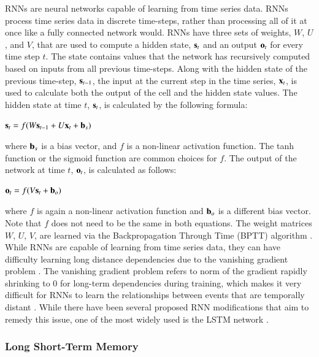\ac{RNNs} are neural networks capable of learning from time series data. \ac{RNNs} process time series data in discrete time-steps, rather than processing all of it at once like a fully connected network would. \ac{RNNs} have three sets of weights, $W$, $U$, and $V$, that are used to compute a hidden state, $\text{{\bf s}}_{t}$ and an output $\text{{\bf o}}_t$ for every time step $t$. The state contains values that the network has recursively computed based on inputs from all previous time-steps. Along with the hidden state of the previous time-step, $\text{{\bf s}}_{t-1}$, the input at the current step in the time series, $\text{{\bf x}}_t$, is used to calculate both the output of the cell and the hidden state values. The hidden state at time $t$, $\text{{\bf s}}_t$, is calculated by the following formula:

\begin{center}
   $\text{{\bf s}}_t = f(W\text{{\bf s}}_{t-1} + U\text{{\bf x}}_{t} + \text{{\bf b}}_s)$
\end{center}
where $\text{{\bf b}}_s$ is a bias vector, and $f$ is a non-linear activation function. The tanh function or the sigmoid function are common choices for $f$. The output of the network at time $t$, $\text{{\bf o}}_t$, is calculated as follows:

\begin{center}
    $\text{{\bf o}}_t = f(V\text{{\bf s}}_{t} + \text{{\bf b}}_o)$
\end{center}
where $f$ is again a non-linear activation function and $\text{{\bf b}}_o$ is a different bias vector. Note that $f$ does not need to be the same in both equations. The weight matrices $W$, $U$, $V$, are learned via the Backpropagation Through Time (BPTT) algorithm \cite{werbos:bptt}. While \ac{RNNs} are capable of learning from time series data, they can have difficulty learning long distance dependencies due to the vanishing gradient problem \cite{bengio:vanishing}. The vanishing gradient problem refers to norm of the gradient rapidly shrinking to 0 for long-term dependencies during training, which makes it very difficult for \ac{RNNs} to learn the relationships between events that are temporally distant \cite{pascanu2013difficulty}. While there have been several proposed \ac{RNN} modifications that aim to remedy this issue, one of the most widely used is the \ac{LSTM} network \cite{hochreiter:nc97}.

\subsubsection{Long Short-Term Memory}
\label{section:lstm_background}

